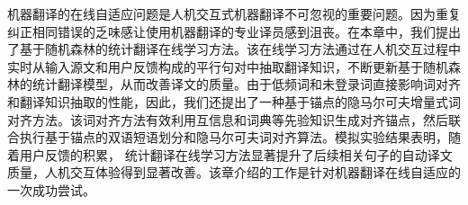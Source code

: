 机器翻译的在线自适应问题是人机交互式机器翻译不可忽视的重要问题。因为重复纠正相同错误的乏味感让使用机器翻译的专业译员感到沮丧。在本章中，我们提出了基于随机森林的统计翻译在线学习方法。该在线学习方法通过在人机交互过程中实时从输入源文和用户反馈构成的平行句对中抽取翻译知识，不断更新基于随机森林的统计翻译模型，从而改善译文的质量。由于低频词和未登录词直接影响词对齐和翻译知识抽取的性能，因此，我们还提出了一种基于锚点的隐马尔可夫增量式词对齐方法。该词对齐方法有效利用互信息和词典等先验知识生成对齐锚点，然后联合执行基于锚点的双语短语划分和隐马尔可夫词对齐算法。模拟实验结果表明，随着用户反馈的积累， 统计翻译在线学习方法显著提升了后续相关句子的自动译文质量，人机交互体验得到显著改善。该章介绍的工作是针对机器翻译在线自适应的一次成功尝试。